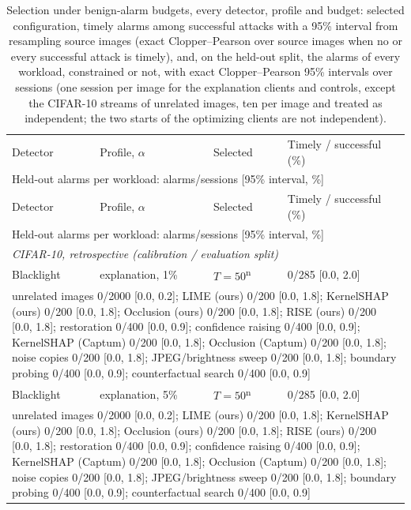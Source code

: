 \begin{footnotesize}
\setlength{\tabcolsep}{3pt}
\begin{longtable}{p{1.6cm}p{2.6cm}p{2.8cm}p{4.6cm}}
\caption{Selection under benign-alarm budgets, every detector, profile and budget: selected configuration, timely alarms among successful attacks with a 95\% interval from resampling source images (exact Clopper--Pearson over source images when no or every successful attack is timely), and, on the held-out split, the alarms of every workload, constrained or not, with exact Clopper--Pearson 95\% intervals over sessions (one session per image for the explanation clients and controls, except the CIFAR-10 streams of unrelated images, ten per image and treated as independent; the two starts of the optimizing clients are not independent).}\label{tab:profile-full}\\
\toprule
Detector & Profile, $\alpha$ & Selected & Timely / successful (\%) \\
\multicolumn{4}{p{12.8cm}}{\quad Held-out alarms per workload: alarms/sessions [95\% interval, \%]} \\
\midrule
\endfirsthead
\toprule
Detector & Profile, $\alpha$ & Selected & Timely / successful (\%) \\
\multicolumn{4}{p{12.8cm}}{\quad Held-out alarms per workload: alarms/sessions [95\% interval, \%]} \\
\midrule
\endhead
\multicolumn{4}{l}{\emph{CIFAR-10, retrospective (calibration / evaluation split)}} \\
Blacklight & explanation, 1\% & $T=50$\textsuperscript{n} & 0/285 [0.0, 2.0] \\
\multicolumn{4}{p{12.8cm}}{\raggedright\quad unrelated images 0/2000 [0.0, 0.2]; LIME (ours) 0/200 [0.0, 1.8]; KernelSHAP (ours) 0/200 [0.0, 1.8]; Occlusion (ours) 0/200 [0.0, 1.8]; RISE (ours) 0/200 [0.0, 1.8]; restoration 0/400 [0.0, 0.9]; confidence raising 0/400 [0.0, 0.9]; KernelSHAP (Captum) 0/200 [0.0, 1.8]; Occlusion (Captum) 0/200 [0.0, 1.8]; noise copies 0/200 [0.0, 1.8]; JPEG/brightness sweep 0/200 [0.0, 1.8]; boundary probing 0/400 [0.0, 0.9]; counterfactual search 0/400 [0.0, 0.9]} \\[4pt]
Blacklight & explanation, 5\% & $T=50$\textsuperscript{n} & 0/285 [0.0, 2.0] \\
\multicolumn{4}{p{12.8cm}}{\raggedright\quad unrelated images 0/2000 [0.0, 0.2]; LIME (ours) 0/200 [0.0, 1.8]; KernelSHAP (ours) 0/200 [0.0, 1.8]; Occlusion (ours) 0/200 [0.0, 1.8]; RISE (ours) 0/200 [0.0, 1.8]; restoration 0/400 [0.0, 0.9]; confidence raising 0/400 [0.0, 0.9]; KernelSHAP (Captum) 0/200 [0.0, 1.8]; Occlusion (Captum) 0/200 [0.0, 1.8]; noise copies 0/200 [0.0, 1.8]; JPEG/brightness sweep 0/200 [0.0, 1.8]; boundary probing 0/400 [0.0, 0.9]; counterfactual search 0/400 [0.0, 0.9]} \\[4pt]

\end{longtable}
\end{footnotesize}

